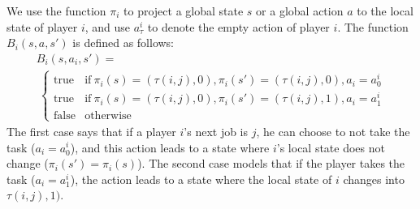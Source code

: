 We use the function $\pi_i$ to project a global state $s$ or a global action $a$ to the local state of player $i$, and use $a^i_{\tau}$ to denote the empty action of player $i$. The function $B_i(s, a, s')$ is defined as follows:
\[
\begin{array}{l}
B_i(s, a_i, s')=\\
\ \left\{
\begin{array}{ll}
\mbox{true} &\mbox{if}\ \pi_i(s)=(\tau(i,j),0), \pi_i(s')=(\tau(i,j), 0), a_i=a^i_0\\
\mbox{true} & \mbox{if}\ \pi_i(s)=(\tau(i,j),0), \pi_i(s')=(\tau(i,j), 1),a_i=a^i_1\\
\mbox{false}& \mbox{otherwise}
\end{array}
\right.
\end{array}
\]
The first case says that if a player $i$'s next job is $j$, he can choose to not take the task ($a_i=a^i_0$), and this action leads to a state where $i$'s local state does not change ($\pi_i(s')=\pi_i(s)$). The second case models that if the player takes the task ($a_i=a^i_1$), the action leads to a state where the local state of $i$ changes into $\tau(i,j), 1)$.

